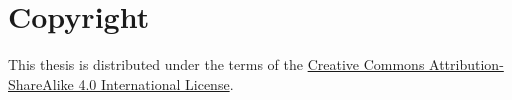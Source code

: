 \chapter*{Copyright}

This thesis is distributed under the terms of the
\href{http://creativecommons.org/licenses/by-sa/4.0/}{Creative Commons Attribution-ShareAlike 4.0 International License}.
